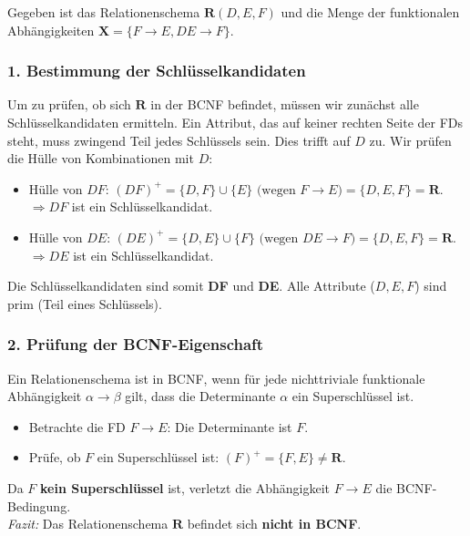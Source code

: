 \documentclass[12pt]{scrartcl}
\begin{document}

    \newpage


Gegeben ist das Relationenschema $\mathbf{R}(D, E, F)$ und die Menge der funktionalen Abhängigkeiten $\mathbf{X} = \{F \rightarrow E, DE \rightarrow F\}$.

\subsubsection*{1. Bestimmung der Schlüsselkandidaten}
Um zu prüfen, ob sich $\mathbf{R}$ in der BCNF befindet, müssen wir zunächst alle Schlüsselkandidaten ermitteln. Ein Attribut, das auf keiner rechten Seite der FDs steht, muss zwingend Teil jedes Schlüssels sein. Dies trifft auf $D$ zu. Wir prüfen die Hülle von Kombinationen mit $D$:
\begin{itemize}
    \item Hülle von $DF$: $(DF)^+ = \{D, F\} \cup \{E\} \text{ (wegen } F \rightarrow E) = \{D, E, F\} = \mathbf{R}$. \\
    $\Rightarrow DF$ ist ein Schlüsselkandidat.
    \item Hülle von $DE$: $(DE)^+ = \{D, E\} \cup \{F\} \text{ (wegen } DE \rightarrow F) = \{D, E, F\} = \mathbf{R}$. \\
    $\Rightarrow DE$ ist ein Schlüsselkandidat.
\end{itemize}
Die Schlüsselkandidaten sind somit \textbf{DF} und \textbf{DE}. Alle Attribute ($D, E, F$) sind prim (Teil eines Schlüssels).

\subsubsection*{2. Prüfung der BCNF-Eigenschaft}
Ein Relationenschema ist in BCNF, wenn für jede nichttriviale funktionale Abhängigkeit $\alpha \rightarrow \beta$ gilt, dass die Determinante $\alpha$ ein Superschlüssel ist.
\begin{itemize}
    \item Betrachte die FD $F \rightarrow E$: Die Determinante ist $F$.
    \item Prüfe, ob $F$ ein Superschlüssel ist: $(F)^+ = \{F, E\} \neq \mathbf{R}$.
\end{itemize}
Da $F$ \textbf{kein Superschlüssel} ist, verletzt die Abhängigkeit $F \rightarrow E$ die BCNF-Bedingung. \\
\textit{Fazit:} Das Relationenschema $\mathbf{R}$ befindet sich \textbf{nicht in BCNF}.
\end{document}
